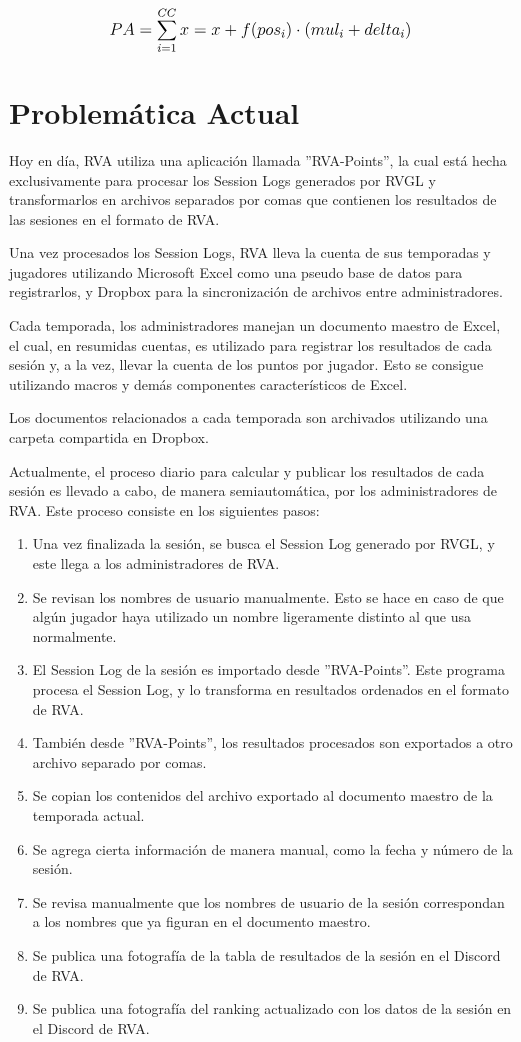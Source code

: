 \[
\mathlarger{{PA} = \sum_{i=1}^{CC}x=x+f(pos_i) \cdot \left(mul_i + delta_i\right)}
\]

\newpage

\section{Problemática Actual}
Hoy en día,  RVA utiliza una aplicación llamada ''RVA-Points'', la cual está hecha exclusivamente para procesar los Session Logs generados por RVGL y transformarlos en archivos separados por comas que contienen los resultados de las sesiones en el formato de RVA.

Una vez procesados los Session Logs, RVA lleva la cuenta de sus temporadas y jugadores utilizando Microsoft Excel como una pseudo base de datos para registrarlos, y Dropbox para la sincronización de archivos entre administradores.

Cada temporada, los administradores manejan un documento maestro de Excel, el cual, en resumidas cuentas, es utilizado para registrar los resultados de cada sesión y, a la vez, llevar la cuenta de los puntos por jugador. Esto se consigue utilizando macros y demás componentes característicos de Excel.

Los documentos relacionados a cada temporada son archivados utilizando una carpeta compartida en Dropbox.

Actualmente, el proceso diario para calcular y publicar los resultados de cada sesión es llevado a cabo, de manera semiautomática, por los administradores de RVA. Este proceso consiste en los siguientes pasos:

\begin{enumerate}
	\item Una vez finalizada la sesión, se busca el Session Log generado por RVGL, y este llega a los administradores de RVA.
	\item Se revisan los nombres de usuario manualmente. Esto se hace en caso de que algún jugador haya utilizado un nombre ligeramente distinto al que usa normalmente.
	\item El Session Log de la sesión es importado desde ''RVA-Points''. Este programa procesa el Session Log, y lo transforma en resultados ordenados en el formato de RVA.
	\item También desde ''RVA-Points'', los resultados procesados son exportados a otro archivo separado por comas.
	\item Se copian los contenidos del archivo exportado al documento maestro de la temporada actual.
	\item Se agrega cierta información de manera manual, como la fecha y número de la sesión.
	\item Se revisa manualmente que los nombres de usuario de la sesión correspondan a los nombres que ya figuran en el documento maestro.
	\item Se publica una fotografía de la tabla de resultados de la sesión en el Discord de RVA.
	\item Se publica una fotografía del ranking actualizado con los datos de la sesión en el Discord de RVA.
\end{enumerate}

